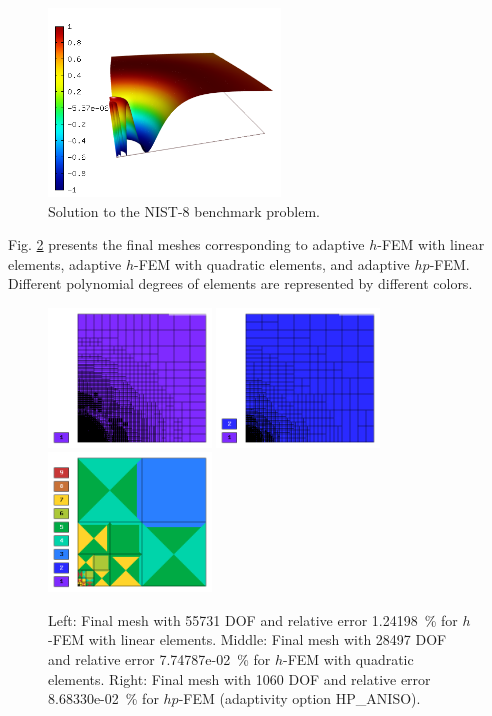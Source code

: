 \documentclass[12pt]{elsarticle}
\begin{document}
\begin{figure}[H]
\centering
\vspace{-3mm}
\includegraphics[height=5cm]{nist/nist-8/solution.png}
\vspace{-3mm}
\caption{Solution to the NIST-8 benchmark problem.}
\vspace{-4mm}
\label{fig:sln-nist08}
\end{figure}


Fig. \ref{fig:nist-8-hp-aniso} presents the final meshes corresponding to adaptive $h$-FEM with
linear elements, adaptive $h$-FEM with quadratic elements, and adaptive $hp$-FEM. Different
polynomial degrees of elements are represented by different colors.

\begin{figure}[H]
\centering
\includegraphics[height=3.7cm]{nist/nist-8/mesh_h1_aniso.png}
\includegraphics[height=3.7cm]{nist/nist-8/mesh_h2_aniso.png}
\includegraphics[height=3.7cm]{nist/nist-8/mesh_hp_aniso.png}
\caption{
Left: Final mesh with 55731 DOF and relative error 1.24198~\% for $h$-FEM with linear elements.
Middle: Final mesh with 28497 DOF and relative error 7.74787e-02~\% for $h$-FEM with quadratic elements.
Right: Final mesh with 1060 DOF and relative error 8.68330e-02~\% for $hp$-FEM (adaptivity option HP\_ANISO).}
\label{fig:nist-8-hp-aniso}
\end{figure}
\end{document}
